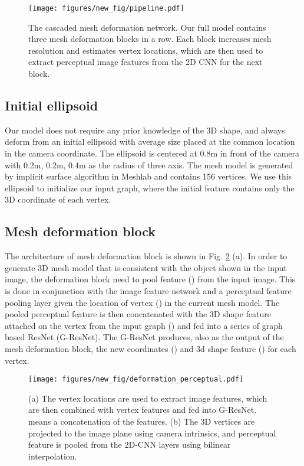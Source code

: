 \documentclass[runningheads]{llncs}
\newcommand{\figref}[1]{Fig. \ref{#1}}
\begin{document}
\begin{figure}[t]
\centering
\texttt{[image: figures/new\_fig/pipeline.pdf]}
\caption{The cascaded mesh deformation network. Our full model contains three mesh deformation blocks in a row. Each block increases mesh resolution and estimates vertex locations, which are then used to extract perceptual image features from the 2D CNN for the next block.}
\label{fig:cmrn}
\end{figure}


\subsection{Initial ellipsoid}
\label{sec:init}
Our model does not require any prior knowledge of the 3D shape, and always deform from an initial ellipsoid with average size placed at the common location in the camera coordinate.
The ellipsoid is centered at 0.8m in front of the camera with 0.2m, 0.2m, 0.4m as the radius of three axis.
The mesh model is generated by implicit surface algorithm in Meshlab \cite{meshlab} and contains 156 vertices.
We use this ellipsoid to initialize our input graph, where the initial feature contains only the 3D coordinate of each vertex.

\subsection{Mesh deformation block}
\label{sec:cmrn}
The architecture of mesh deformation block is shown in \figref{fig:block} (a).
In order to generate 3D mesh model that is consistent with the object shown in the input image, the deformation block need to pool feature () from the input image. This is done in conjunction with the image feature network and a perceptual feature pooling layer given the location of vertex () in the current mesh model.
The pooled perceptual feature is then concatenated with the 3D shape feature attached on the vertex from the input graph () and fed into a series of graph based ResNet (G-ResNet).
The G-ResNet produces, also as the output of the mesh deformation block, the new coordinates () and 3d shape feature () for each vertex.

\begin{figure}[t]
\centering
\texttt{[image: figures/new\_fig/deformation\_perceptual.pdf]}
\caption{(a) The vertex locations  are used to extract image features, which are then combined with vertex features  and fed into G-ResNet.  means a concatenation of the features. (b) The 3D vertices are projected to the image plane using camera intrinsics, and perceptual feature is pooled from the 2D-CNN layers using bilinear interpolation.}
\label{fig:block}
\end{figure}
\end{document}
